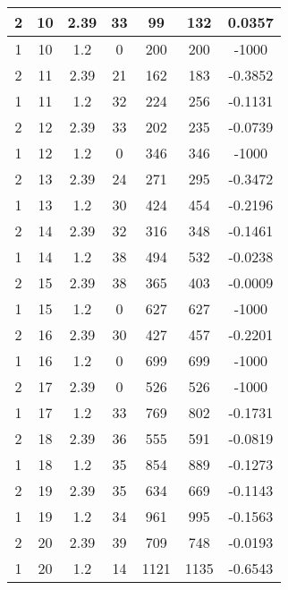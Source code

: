 \documentclass[letterpaper, 12pt]{article}
\begin{document}
\begin{longtable}{|c|c|c|c|c|c|c|}
\hline
2 & 10 & 2.39 & 33 & 99 & 132 & 0.0357 \\
\hline
1 & 10 & 1.2 & 0 & 200 & 200 & -1000 \\
\hline
2 & 11 & 2.39 & 21 & 162 & 183 & -0.3852 \\
\hline
1 & 11 & 1.2 & 32 & 224 & 256 & -0.1131 \\
\hline
2 & 12 & 2.39 & 33 & 202 & 235 & -0.0739 \\
\hline
1 & 12 & 1.2 & 0 & 346 & 346 & -1000 \\
\hline
2 & 13 & 2.39 & 24 & 271 & 295 & -0.3472 \\
\hline
1 & 13 & 1.2 & 30 & 424 & 454 & -0.2196 \\
\hline
2 & 14 & 2.39 & 32 & 316 & 348 & -0.1461 \\
\hline
1 & 14 & 1.2 & 38 & 494 & 532 & -0.0238 \\
\hline
2 & 15 & 2.39 & 38 & 365 & 403 & -0.0009 \\
\hline
1 & 15 & 1.2 & 0 & 627 & 627 & -1000 \\
\hline
2 & 16 & 2.39 & 30 & 427 & 457 & -0.2201 \\
\hline
1 & 16 & 1.2 & 0 & 699 & 699 & -1000 \\
\hline
2 & 17 & 2.39 & 0 & 526 & 526 & -1000 \\
\hline
1 & 17 & 1.2 & 33 & 769 & 802 & -0.1731 \\
\hline
2 & 18 & 2.39 & 36 & 555 & 591 & -0.0819 \\
\hline
1 & 18 & 1.2 & 35 & 854 & 889 & -0.1273 \\
\hline
2 & 19 & 2.39 & 35 & 634 & 669 & -0.1143 \\
\hline
1 & 19 & 1.2 & 34 & 961 & 995 & -0.1563 \\
\hline
2 & 20 & 2.39 & 39 & 709 & 748 & -0.0193 \\
\hline
1 & 20 & 1.2 & 14 & 1121 & 1135 & -0.6543 \\
\hline
\end{longtable}
\end{document}
